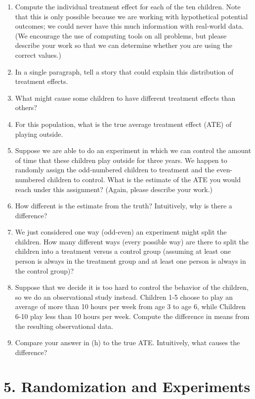 \documentclass[]{article}
\begin{document}
\begin{enumerate}
\def\labelenumi{\alph{enumi}.}
\item
  Compute the individual treatment effect for each of the ten children.
  Note that this is only possible because we are working with
  hypothetical potential outcomes; we could never have this much
  information with real-world data. (We encourage the use of computing
  tools on all problems, but please describe your work so that we can
  determine whether you are using the correct values.)
\item
  In a single paragraph, tell a story that could explain this
  distribution of treatment effects.
\item
  What might cause some children to have different treatment effects
  than others?
\item
  For this population, what is the true average treatment effect (ATE)
  of playing outside.
\item
  Suppose we are able to do an experiment in which we can control the
  amount of time that these children play outside for three years. We
  happen to randomly assign the odd-numbered children to treatment and
  the even-numbered children to control. What is the estimate of the ATE
  you would reach under this assignment? (Again, please describe your
  work.)
\item
  How different is the estimate from the truth? Intuitively, why is
  there a difference?
\item
  We just considered one way (odd-even) an experiment might split the
  children. How many different ways (every possible way) are there to
  split the children into a treatment versus a control group (assuming
  at least one person is always in the treatment group and at least one
  person is always in the control group)?
\item
  Suppose that we decide it is too hard to control the behavior of the
  children, so we do an observational study instead. Children 1-5 choose
  to play an average of more than 10 hours per week from age 3 to age 6,
  while Children 6-10 play less than 10 hours per week. Compute the
  difference in means from the resulting observational data.
\item
  Compare your answer in (h) to the true ATE. Intuitively, what causes
  the difference?
\end{enumerate}

\hypertarget{randomization-and-experiments}{%
\section{5. Randomization and
Experiments}\label{randomization-and-experiments}}
\end{document}
